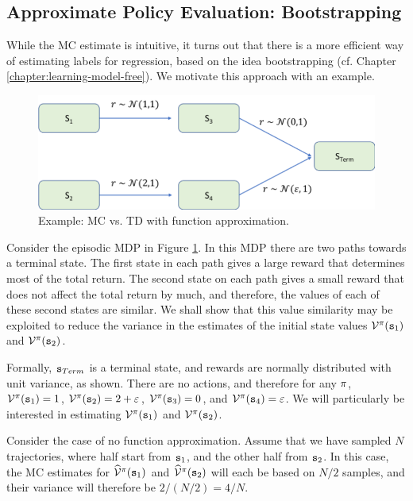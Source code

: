 
\subsection{Approximate Policy Evaluation: Bootstrapping}\label{ssec:APE_bootstrapping}
While the MC estimate is intuitive, it turns out that there is a more efficient way of estimating labels for regression, based on the idea bootstrapping (cf. Chapter \ref{chapter:learning-model-free}). We motivate this approach with an example.

\begin{figure}
    \centering
    \includegraphics[width=\textwidth]{figures/td_vs_mc_FA.png}
    \caption{Example: MC vs. TD with function approximation.}
    \label{fig:td_vs_mc_FA}
\end{figure}

Consider the episodic MDP in Figure \ref{fig:td_vs_mc_FA}.
In this MDP there are two paths towards a terminal state. The first state in each path gives a large reward that determines most of the total return. The second state on each path gives a small reward that does not affect the total return by much, and therefore, the values of each of these second states are similar. We shall show that this value similarity may be exploited to reduce the variance in the estimates of the initial state values $\mathcal{V}^{\pi}({\tt s}_1)$ and $\mathcal{V}^{\pi}({\tt s}_2)$.

Formally, ${\tt s}_{Term}$ is a terminal state, and rewards are normally distributed with unit variance, as shown. There are no actions, and therefore for any $\pi$, $\mathcal{V}^{\pi}({\tt s}_1) = 1$, $\mathcal{V}^{\pi}({\tt s}_2) = 2+\varepsilon$, $\mathcal{V}^{\pi}({\tt s}_3) = 0$, and $\mathcal{V}^{\pi}({\tt s}_4) = \varepsilon$. We will particularly be interested in estimating $\mathcal{V}^{\pi}({\tt s}_1)$ and $\mathcal{V}^{\pi}({\tt s}_2)$.

Consider the case of no function approximation. Assume that we have sampled $N$ trajectories, where half start from ${\tt s}_1$, and the other half from ${\tt s}_2$. In this case, the MC estimates for $\widehat{\mathcal{V}}^{\pi}({\tt s}_1)$ and $\widehat{\mathcal{V}}^{\pi}({\tt s}_2)$ will each be based on $N/2$ samples, and their variance will therefore be $2 / ({N}/{2}) = 4/{N}$.

